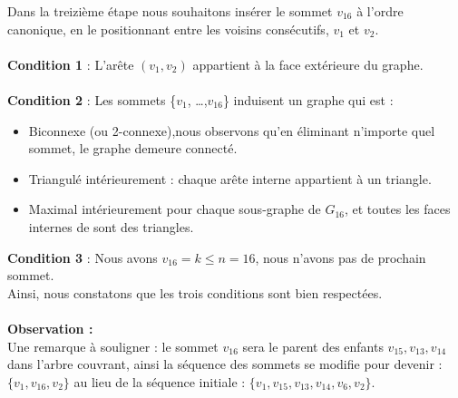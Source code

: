 \documentclass[hidelinks,letterpaper,12pt]{article}
\begin{document}
\begin{figure}[H]
\label{Graphe $G_{16}$}	
\end{figure}
Dans la treizième étape nous souhaitons insérer le sommet $v_{16}$ à l'ordre canonique, en le positionnant entre les voisins consécutifs, $v_{1}$ et $v_{2}$.
\\ \\
\textbf{Condition 1} : L'arête \( (v_1,v_2) \) appartient à la face extérieure du graphe.
\\ \\
\textbf{Condition 2} : Les sommets \{$v_1$, \ldots ,$v_{16}$\} induisent un graphe qui est :
\begin{itemize}
\item Biconnexe (ou 2-connexe),nous observons qu'en éliminant n'importe quel sommet, le graphe demeure connecté.
\item Triangulé intérieurement : chaque arête interne appartient à un triangle.
\item Maximal intérieurement pour chaque sous-graphe de $G_{16}$, et toutes les faces internes de sont des triangles.
\\
\end{itemize}
\textbf{Condition 3} : Nous avons $v_{16}=k \leq n=16$, nous n'avons pas de prochain sommet.
\\
Ainsi, nous constatons que les trois conditions sont bien respectées.
\\ \\
\textbf{Observation :}
\\
Une remarque à souligner : le sommet \(v_{16}\) sera le parent des enfants \(v_{15}, v_{13}, v_{14}\) dans l'arbre couvrant, ainsi la séquence des sommets se modifie pour devenir : \(\{v_1, v_{16}, v_2 \}\) au lieu de la séquence initiale : \(\{ v_1, v_{15}, v_{13}, v_{14}, v_{6}, v_2 \}\).
\end{document}
